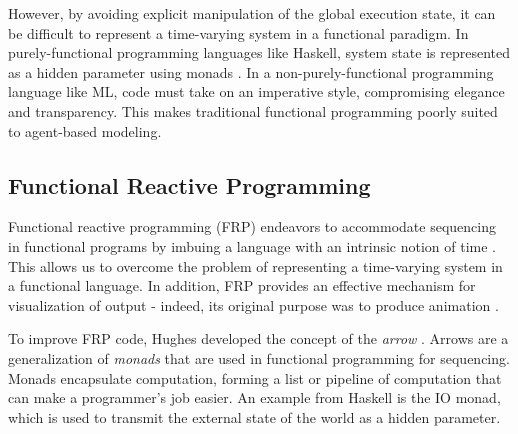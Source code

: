 \documentclass{sig-alternate}
\begin{document}
However, by avoiding explicit manipulation of the global execution state, it can be difficult to represent a time-varying system in a functional paradigm. In purely-functional programming languages like Haskell, system state is represented as a hidden parameter using monads \cite{essence}. In a non-purely-functional programming language like ML, code must take on an imperative style, compromising elegance and transparency. This makes traditional functional programming poorly suited to agent-based modeling.

\subsection{Functional Reactive Programming}

Functional reactive programming (FRP) endeavors to accommodate sequencing in functional programs by imbuing a language with an intrinsic notion of time \cite{frpcont,yampa}. This allows us to overcome the problem of representing a time-varying system in a functional language. In addition, FRP provides an effective mechanism for visualization of output - indeed, its original purpose was to produce animation \cite{fran}.


To improve FRP code, Hughes developed the concept of the \emph{arrow} \cite{mon2arr}. Arrows are a generalization of \emph{monads} that are used in functional programming for sequencing. Monads encapsulate computation, forming a list or pipeline of computation that can make a programmer's job easier. An example from Haskell is the IO monad, which is used to transmit the external state of the world as a hidden parameter.
\end{document}
